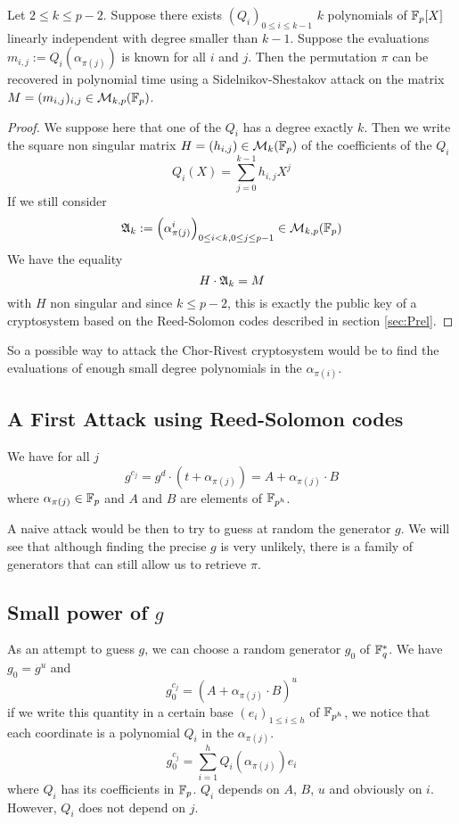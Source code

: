 \documentclass[12pt,a4paper,titlepage]{article}
\newcommand{\GF}[1]{\F_{#1}}
\begin{document}
\begin{theorem}
\label{thm:link}
Let $2 \leq k \leq p-2$.
Suppose there exists $(Q_i)_{0 \leq i \leq k-1}$ $k$ polynomials of $\GF{p}[X]$ linearly independent with degree smaller than $k-1$.
Suppose the evaluations $m_{i,j} := Q_i(\alpha_{\pi(j)})$ is known for all $i$ and $j$.
Then the permutation $\pi$ can be recovered in polynomial time using a Sidelnikov-Shestakov attack on the matrix $M = (m_{i,j})_{i,j} \in \mathcal{M}_{k,p}(\GF{p})$.
\end{theorem}
\begin{proof}
We suppose here that one of the $Q_i$ has a degree exactly $k$.
Then we write the square non singular matrix $H = (h_{i,j}) \in \mathcal{M}_k(\GF{p})$ of the coefficients of the $Q_i$
$$ Q_i(X) = \sum_{j=0}^{k-1} h_{i,j} X^j $$
If we still consider
$$ \A_k := \left( \alpha_{\pi(j)}^i \right)_{0 \leq i < k, 0 \leq j \leq p-1} \in \mathcal{M}_{k,p}(\GF{p})$$
We have the equality
$$ H \cdot \mathfrak{A}_k = M$$
with $H$ non singular and since $k \leq p-2$, this is exactly the public key of a cryptosystem based on the Reed-Solomon codes described in section \ref{sec:Prel}.
\end{proof}

So a possible way to attack the Chor-Rivest cryptosystem would be to find the evaluations of enough small degree polynomials in the $\alpha_{\pi(i)}$.



\subsection{A First Attack using Reed-Solomon codes}

We have for all $j$
$$ g^{c_j} = g^d \cdot (t + \alpha_{\pi(j)} ) = A + \alpha_{\pi(j)} \cdot B $$
where $\alpha_{\pi(j)} \in \GF{p}$ and $A$ and $B$ are elements of $\GF{p^h}$.

A naive attack would be then to try to guess at random the generator $g$. We will see that although finding the precise $g$ is very unlikely, there is a family of generators that can still allow us to retrieve $\pi$.

\subsection{Small power of $g$}

As an attempt to guess $g$, we can choose a random generator $g_0$ of $\GF{q}^{*}$. We have $g_0 = g^u$ and
$$ g_0 ^{c_j} = (A + \alpha_{\pi(j)} \cdot B)^u $$
if we write this quantity in a certain base $(e_i)_{1 \leq i \leq h}$ of $\GF{p^h}$, we notice that each coordinate is a polynomial $Q_i$ in the $\alpha_{\pi(j)}$.
$$ g_0^{c_j} = \sum_{i=1}^h Q_i(\alpha_{\pi(j)}) e_i $$
where $Q_i$ has its coefficients in $\GF{p}$.
$Q_i$ depends on $A$, $B$, $u$ and obviously on $i$. However, $Q_i$ does not depend on $j$.
\end{document}
